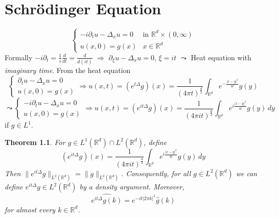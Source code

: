 \documentclass{report}
\theoremstyle{tommy}
\newtheorem{thm}[defn]{Theorem}
\begin{document}
  \chapter{Schrödinger Equation}
  \[\begin{cases}
    -i \partial_t u - \Delta_x u = 0 &\text{in } \mathbb{R}^d \times (0,\infty)\\
    u(x,0) = g(x) &x \in \mathbb{R}^d
  \end{cases}\]
  Formally 
  \(-i \partial_t = \frac{1}{i} \frac{d}{dt} = \frac{d}{d(it)}\) \(\Rightarrow\) \(\partial_\xi u - \Delta_x u = 0\), \(\xi = it\) \(\leadsto\) Heat equation with \emph{imaginary time}.
  From the heat equation 
  \[\begin{cases}
    \partial_t u - \Delta_x u = 0 \\ u(x,0) = g(x)
  \end{cases} \Rightarrow u(x,t) = (e^{t\Delta} g)(x) = \frac{1}{(4 \pi t)^{\frac{d}{2}}}\int_{\mathbb{R}^d} e^{-\frac{|x-y|^2}{4t}} g(y)\]
  \[\leadsto \begin{cases}
    - i \partial_t u - \Delta_x u = 0 \\ u(x,0) = g(x)
  \end{cases} \Rightarrow u(x,t) = (e^{it\Delta}g)(x) = \frac{1}{(4 \pi it)^{\frac{d}{2}}} \int_{\mathbb{R}^d} e^{i \frac{|x-y|^2}{4t}} g(y) \, dy\]
  if \(g \in L^1\).

  
  \begin{thm}
    For \(g \in L^1(\mathbb{R}^d) \cap L^2(\mathbb{R}^d)\), define 
    \[(e^{it\Delta}g)(x) = \frac{1}{(4 \pi it)^{\frac{d}{2}}} \int_{\mathbb{R}^d} e^{i \frac{|x-y|^2}{4t}} g(y) \, dy\]
    Then \(\|e^{it\Delta}g\|_{L^2(\mathbb{R}^d)} = \|g\|_{L^2(\mathbb{R}^d)}\). Consequently, for all \(g \in L^2(\mathbb{R}^d)\) we can define \(e^{it \Delta} g \in L^2(\mathbb{R}^d)\) by a density argument. Moreover, 
    \[\widehat{e^{i t \Delta}g(k)} = e^{-it |2 \pi k|^2} \hat g(k)\]
    for almost every \(k \in \mathbb{R}^d\).
  \end{thm}
\end{document}
